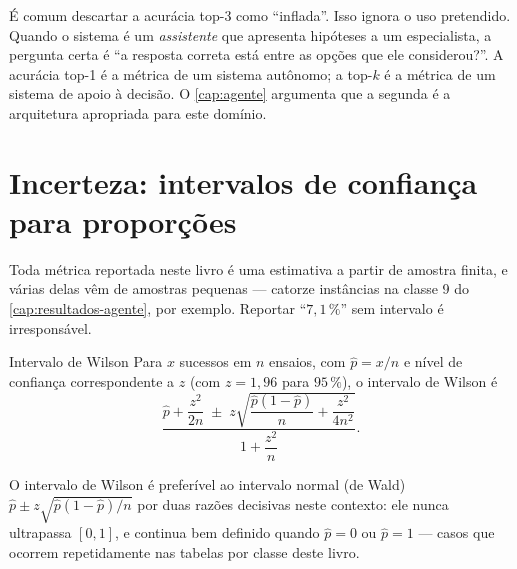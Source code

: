 \begin{destaque}
É comum descartar a acurácia top-3 como ``inflada''. Isso ignora o uso pretendido.
Quando o sistema é um \emph{assistente} que apresenta hipóteses a um especialista, a
pergunta certa é ``a resposta correta está entre as opções que ele considerou?''.
A acurácia top-1 é a métrica de um sistema autônomo; a top-$k$ é a métrica de um
sistema de apoio à decisão. O \cref{cap:agente} argumenta que a segunda é a arquitetura
apropriada para este domínio.
\end{destaque}

\section{Incerteza: intervalos de confiança para proporções}

Toda métrica reportada neste livro é uma estimativa a partir de amostra finita, e várias
delas vêm de amostras pequenas --- catorze instâncias na classe 9 do
\cref{cap:resultados-agente}, por exemplo. Reportar ``$7{,}1\,\%$'' sem intervalo é
irresponsável.

\begin{definicao}{Intervalo de Wilson}
Para $x$ sucessos em $n$ ensaios, com $\hat{p} = x/n$ e nível de confiança
correspondente a $z$ (com $z = 1{,}96$ para $95\,\%$), o intervalo de Wilson
\citep{Wilson1927} é
\begin{equation}
  \frac{\hat{p} + \dfrac{z^{2}}{2n} \;\pm\; z\sqrt{\dfrac{\hat{p}(1-\hat{p})}{n}
  + \dfrac{z^{2}}{4n^{2}}}}{1 + \dfrac{z^{2}}{n}}.
  \label{eq:wilson}
\end{equation}
\end{definicao}

O intervalo de Wilson é preferível ao intervalo normal (de Wald)
$\hat{p} \pm z\sqrt{\hat{p}(1-\hat{p})/n}$ por duas razões decisivas neste contexto:
ele nunca ultrapassa $[0,1]$, e continua bem definido quando $\hat{p} = 0$ ou
$\hat{p} = 1$ --- casos que ocorrem repetidamente nas tabelas por classe deste livro.

